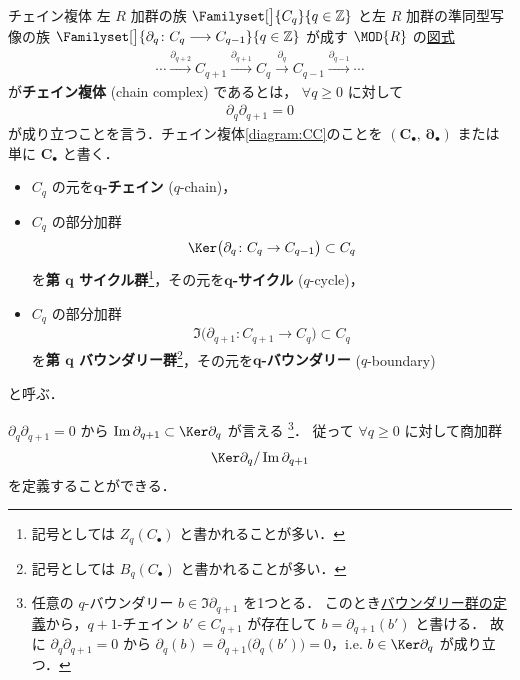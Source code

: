 \documentclass[algtopo_main]{subfiles}
\begin{document}
\begin{mydef}[label=def:CC, breakable]{チェイン複体}
    左 $R$ 加群の族 $\Familyset[\big]{C_q}{q \in \mathbb{Z}}$ と左 $R$ 加群の準同型写像の族 $\Familyset[\big]{\partial_q \colon C_{q} \lto C_{q-1}}{q \in \mathbb{Z}}$  
    が成す $\MOD{R}$ の\underline{図式}
    \begin{align}
        \label{diagram:CC}
        \cdots \xrightarrow{\partial_{q+2}} C_{q+1} \xrightarrow{\partial_{q+1}} C_{q}  \xrightarrow{\partial_q} C_{q-1} \xrightarrow{\partial_{q-1}} \cdots
    \end{align}
    が\textbf{チェイン複体} (chain complex) であるとは，
    $\forall q \ge 0$ に対して
    \begin{align}
        \partial_q \partial_{q+1} = 0
    \end{align}
    が成り立つことを言う．チェイン複体\eqref{diagram:CC}のことを $\bm{(C_\bullet,\, \partial_\bullet)}$ または単に $\bm{C_\bullet}$ と書く．
    \tcblower
    \begin{itemize}
        \item $C_q$ の元を\textbf{$\bm{q}$-チェイン} ($q$-chain)，
        \item $C_q$ の部分加群
        \begin{align}
            \Ker \bigl( \partial_q \colon C_q \to C_{q-1} \bigr) \subset C_q
        \end{align}
        を\textbf{第 $\bm{q}$ サイクル群}\footnote{記号としては $Z_q(C_\bullet)$ と書かれることが多い．}，その元を\textbf{$\bm{q}$-サイクル} ($q$-cycle)，
        \item $C_q$ の部分加群
        \begin{align}
            \Im \bigl( \partial_{q+1} \colon C_{q+1} \to C_q \bigr) \subset C_q
        \end{align}
        を\textbf{第 $\bm{q}$ バウンダリー群}\footnote{記号としては $B_q(C_\bullet)$ と書かれることが多い．}，その元を\textbf{$\bm{q}$-バウンダリー} ($q$-boundary)
    \end{itemize}
    と呼ぶ．
\end{mydef}

$\partial_q \partial_{q+1} = 0$ から $\Im \partial_{q+1} \subset \Ker \partial_q$ が言える
\footnote{
    任意の $q$-バウンダリー $b \in \Im \partial_{q+1}$ を1つとる． 
    このとき\hyperref[def:CC]{バウンダリー群の定義}から，$q+1$-チェイン $b' \in C_{q+1}$ が存在して $b = \partial_{q+1} (b')$ と書ける．
    故に $\partial_q \partial_{q+1} = 0$ から $\partial_q (b) = \partial_{q+1} \bigl( \partial_q (b') \bigr) = 0$，i.e. $b \in \Ker \partial_q$ が成り立つ．
}．
従って $\forall q \ge 0$ に対して商加群
\begin{align}
    \label{def:homology-group}
    \Ker \partial_q / \Im \partial_{q+1}
\end{align}
を定義することができる．
\end{document}
